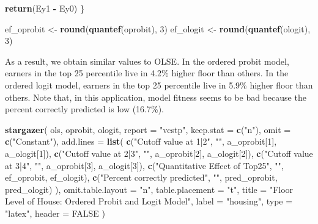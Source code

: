 \documentclass[
  12pt,
]{article}
\newenvironment{Shaded}{\begin{snugshade}}{\end{snugshade}}
\newcommand{\DataTypeTok}[1]{\textcolor[rgb]{0.13,0.29,0.53}{#1}}
\newcommand{\DecValTok}[1]{\textcolor[rgb]{0.00,0.00,0.81}{#1}}
\newcommand{\KeywordTok}[1]{\textcolor[rgb]{0.13,0.29,0.53}{\textbf{#1}}}
\newcommand{\NormalTok}[1]{#1}
\newcommand{\OperatorTok}[1]{\textcolor[rgb]{0.81,0.36,0.00}{\textbf{#1}}}
\newcommand{\OtherTok}[1]{\textcolor[rgb]{0.56,0.35,0.01}{#1}}
\newcommand{\StringTok}[1]{\textcolor[rgb]{0.31,0.60,0.02}{#1}}
\begin{document}
\begin{Shaded}
\begin{Highlighting}[]
  \KeywordTok{return}\NormalTok{(Ey1 }\OperatorTok{{-}}\StringTok{ }\NormalTok{Ey0)}
\NormalTok{\} }

\NormalTok{ef\_oprobit \textless{}{-}}\StringTok{ }\KeywordTok{round}\NormalTok{(}\KeywordTok{quantef}\NormalTok{(oprobit), }\DecValTok{3}\NormalTok{)}
\NormalTok{ef\_ologit \textless{}{-}}\StringTok{ }\KeywordTok{round}\NormalTok{(}\KeywordTok{quantef}\NormalTok{(ologit), }\DecValTok{3}\NormalTok{)}
\end{Highlighting}
\end{Shaded}

As a result, we obtain similar values to OLSE. In the ordered probit
model, earners in the top 25 percentile live in 4.2\% higher floor than
others. In the ordered logit model, earners in the top 25 percentile
live in 5.9\% higher floor than others. Note that, in this application,
model fitness seems to be bad because the percent correctly predicted is
low (16.7\%).

\begin{Shaded}
\begin{Highlighting}[]
\KeywordTok{stargazer}\NormalTok{(}
\NormalTok{  ols, oprobit, ologit,}
  \DataTypeTok{report =} \StringTok{"vcstp"}\NormalTok{, }\DataTypeTok{keep.stat =} \KeywordTok{c}\NormalTok{(}\StringTok{"n"}\NormalTok{),}
  \DataTypeTok{omit =} \KeywordTok{c}\NormalTok{(}\StringTok{"Constant"}\NormalTok{),}
  \DataTypeTok{add.lines =} \KeywordTok{list}\NormalTok{(}
    \KeywordTok{c}\NormalTok{(}\StringTok{"Cutoff value at 1|2"}\NormalTok{, }\StringTok{""}\NormalTok{, a\_oprobit[}\DecValTok{1}\NormalTok{], a\_ologit[}\DecValTok{1}\NormalTok{]),}
    \KeywordTok{c}\NormalTok{(}\StringTok{"Cutoff value at 2|3"}\NormalTok{, }\StringTok{""}\NormalTok{, a\_oprobit[}\DecValTok{2}\NormalTok{], a\_ologit[}\DecValTok{2}\NormalTok{]),}
    \KeywordTok{c}\NormalTok{(}\StringTok{"Cutoff value at 3|4"}\NormalTok{, }\StringTok{""}\NormalTok{, a\_oprobit[}\DecValTok{3}\NormalTok{], a\_ologit[}\DecValTok{3}\NormalTok{]),}
    \KeywordTok{c}\NormalTok{(}\StringTok{"Quantitative Effect of Top25"}\NormalTok{, }\StringTok{""}\NormalTok{, ef\_oprobit, ef\_ologit),}
    \KeywordTok{c}\NormalTok{(}\StringTok{"Percent correctly predicted"}\NormalTok{, }\StringTok{""}\NormalTok{, pred\_oprobit, pred\_ologit)}
\NormalTok{  ),}
  \DataTypeTok{omit.table.layout =} \StringTok{"n"}\NormalTok{, }\DataTypeTok{table.placement =} \StringTok{"t"}\NormalTok{,}
  \DataTypeTok{title =} \StringTok{"Floor Level of House: Ordered Probit and Logit Model"}\NormalTok{,}
  \DataTypeTok{label =} \StringTok{"housing"}\NormalTok{,}
  \DataTypeTok{type =} \StringTok{"latex"}\NormalTok{, }\DataTypeTok{header =} \OtherTok{FALSE}
\NormalTok{)}
\end{Highlighting}
\end{Shaded}
\end{document}
